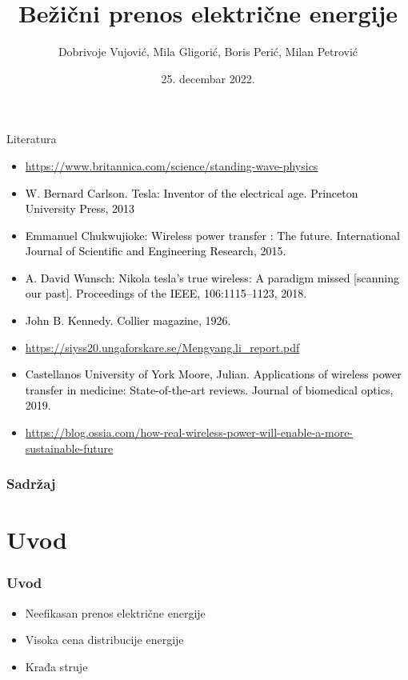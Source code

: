 \documentclass[10pt]{beamer}
\title{Bežični prenos električne energije}
\author{Dobrivoje Vujović, Mila Gligorić, Boris Perić, Milan Petrović}
\institute{Matematički fakultet Univerziteta u Beogradu}
\date{
	\footnotesize{25. decembar 2022.}	
}
\begin{document}
\begin{frame}
	\thispagestyle{empty}
	\titlepage
\end{frame}

\addtocounter{framenumber}{-1}

\begin{frame}{Literatura}
	\begin{itemize}
		
 	\item \textcolor{black}{{\footnotesize}}{\footnotesize \url{https://www.britannica.com/science/standing-wave-physics}}
	\item \textcolor{black}{{\footnotesize W. Bernard Carlson. Tesla: Inventor of the electrical age. Princeton University Press, 2013}}
	\item \textcolor{black}{{\footnotesize Emmanuel Chukwujioke: Wireless power transfer : The future. International Journal of Scientiﬁc and Engineering Research, 2015.}}
	\item \textcolor{black}{{\footnotesize A. David Wunsch:  Nikola tesla’s true wireless: A paradigm missed [scanning our past]. Proceedings of the IEEE, 106:1115–1123, 2018.}}
	\item \textcolor{black}{{\footnotesize John B. Kennedy. Collier magazine, 1926.}}
	\item \textcolor{black}{{\footnotesize}} {\footnotesize \url{https://siyss20.ungaforskare.se/Mengyang.li_report.pdf}}		
	\item \textcolor{black}{{\footnotesize Castellanos University of York Moore, Julian. Applications of wireless power transfer in medicine: State-of-the-art reviews. Journal of biomedical optics, 2019.}}
	\item \textcolor{black}{{\footnotesize}} {\footnotesize \url{https://blog.ossia.com/how-real-wireless-power-will-enable-a-more-sustainable-future}}		
	\end{itemize}
\end{frame}

\begin{frame}
	\frametitle{Sadržaj} %
	\tableofcontents[hidesubsections] 
\end{frame}

\section{Uvod}

\begin{frame}\frametitle{Uvod}
	\begin{itemize}	
		\item Neefikasan prenos električne energije
		\item Visoka cena distribucije energije
		\item Krađa struje
	\end{itemize}
\end{frame}
\end{document}

